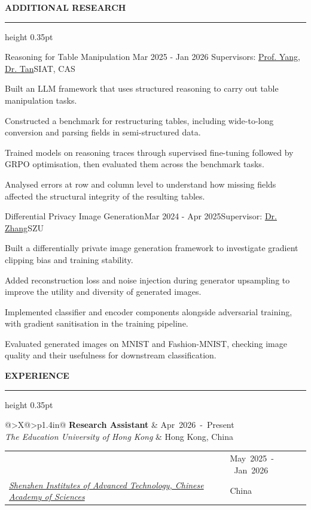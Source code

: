 \documentclass{resume} %
\makeatletter
\newcommand{\cvPosition}[4]{%
    \noindent\begin{tabularx}{\linewidth}{@{}>{\RaggedRight\hyphenpenalty=10000\arraybackslash}X@{\hspace{10pt}}>{\RaggedLeft\arraybackslash}p{1.4in}@{}}
      {\bfseries #1} & {\small\mbox{#2}} \\
      \textit{#3} & {\small #4} \\
    \end{tabularx}\par\medskip
  }
\renewenvironment{rSection}[1]{
  \sectionskip
  \textbf{\MakeUppercase{#1}}
  \sectionlineskip
  {\color[gray]{0.6}\hrule height 0.35pt}
  \begin{list}{}{
  \setlength{\leftmargin}{1.5em}
  \setlength{\topsep}{4pt}
  \setlength{\partopsep}{0pt}
  }
  \item[]\RaggedRight\hyphenpenalty=10000\relax
  }{
  \end{list}
  }
\makeatother
\begin{document}
  \begin{rSection}{Additional Research}

  \begin{rSubsection}{Reasoning for Table Manipulation }{Mar 2025 - Jan 2026}
  {Supervisors: \href{https://minyang.me/}{Prof. Yang}, \href{https://szs.siat.ac.cn/siat/2025-02/21/article_2025022105340818693.html}{Dr. Tan}}{SIAT, CAS}
  \item Built an LLM framework that uses structured reasoning to carry out table manipulation
  tasks.
  \item Constructed a benchmark for restructuring tables, including wide-to-long conversion
  and parsing fields in semi-structured data.
  \item Trained models on reasoning traces through supervised fine-tuning followed by GRPO
  optimisation, then evaluated them across the benchmark tasks.
  \item Analysed errors at row and column level to understand how missing fields affected
  the structural integrity of the resulting tables.
  \end{rSubsection}

  \begin{rSubsection}{Differential Privacy Image Generation}{Mar 2024 - Apr 2025}{Supervisor:
  \href{https://fe.szu.edu.cn/info/1023/1133.htm}{Dr. Zhang}}{SZU}
  \item Built a differentially private image generation framework to investigate gradient
  clipping bias and training stability.
  \item Added reconstruction loss and noise injection during generator upsampling to improve
  the utility and diversity of generated images.
  \item Implemented classifier and encoder components alongside adversarial training,
  with gradient sanitisation in the training pipeline.
  \item Evaluated generated images on MNIST and Fashion-MNIST, checking image quality
  and their usefulness for downstream classification.
  \end{rSubsection}

  \end{rSection}





  \begin{rSection}{Experience}

  \cvPosition{Research Assistant}{Apr 2026 - Present}{The Education University of Hong
  Kong}{Hong Kong, China}

  \cvPosition{Research Intern}{May 2025 - Jan 2026}{\href{http://english.siat.cas.cn/}
  {Shenzhen Institutes of Advanced Technology, Chinese Academy of Sciences}}{China}

  \end{rSection}

  
\end{document}

